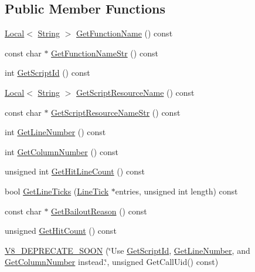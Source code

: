 \subsection*{Public Member Functions}
\begin{DoxyCompactItemize}
\item 
\mbox{\hyperlink{classv8_1_1Local}{Local}}$<$ \mbox{\hyperlink{classv8_1_1String}{String}} $>$ \mbox{\hyperlink{classv8_1_1CpuProfileNode_addacb8c9ca25fb14450f1bcf3c0ef4de}{Get\+Function\+Name}} () const
\item 
const char $\ast$ \mbox{\hyperlink{classv8_1_1CpuProfileNode_a8c6b47ccf397aed8f0454d9c6a4f05e2}{Get\+Function\+Name\+Str}} () const
\item 
int \mbox{\hyperlink{classv8_1_1CpuProfileNode_aef0b693911218f14745f2c51b4c9a860}{Get\+Script\+Id}} () const
\item 
\mbox{\hyperlink{classv8_1_1Local}{Local}}$<$ \mbox{\hyperlink{classv8_1_1String}{String}} $>$ \mbox{\hyperlink{classv8_1_1CpuProfileNode_aa827e7c9219cf49bdca2fcff33494ba0}{Get\+Script\+Resource\+Name}} () const
\item 
const char $\ast$ \mbox{\hyperlink{classv8_1_1CpuProfileNode_acae57cbfbc54cc9c030c31685571096a}{Get\+Script\+Resource\+Name\+Str}} () const
\item 
int \mbox{\hyperlink{classv8_1_1CpuProfileNode_a6616c8d1893da19183d57e6488eb2743}{Get\+Line\+Number}} () const
\item 
int \mbox{\hyperlink{classv8_1_1CpuProfileNode_a9df61090cf365f1f03d5bce44653f1f5}{Get\+Column\+Number}} () const
\item 
unsigned int \mbox{\hyperlink{classv8_1_1CpuProfileNode_a5b956d1b3aea5a9710632b28b1e85dfd}{Get\+Hit\+Line\+Count}} () const
\item 
bool \mbox{\hyperlink{classv8_1_1CpuProfileNode_a3a05d924e53c241225b9d3bf61af05db}{Get\+Line\+Ticks}} (\mbox{\hyperlink{structv8_1_1CpuProfileNode_1_1LineTick}{Line\+Tick}} $\ast$entries, unsigned int length) const
\item 
const char $\ast$ \mbox{\hyperlink{classv8_1_1CpuProfileNode_a4c811a611ba68f0484ad3eb560898889}{Get\+Bailout\+Reason}} () const
\item 
unsigned \mbox{\hyperlink{classv8_1_1CpuProfileNode_a56d1cece4ee808022b9eb7f3eb66b93a}{Get\+Hit\+Count}} () const
\item 
\mbox{\hyperlink{classv8_1_1CpuProfileNode_a5285f35c759e2b0afa74f4db0e0bc50c}{V8\+\_\+\+D\+E\+P\+R\+E\+C\+A\+T\+E\+\_\+\+S\+O\+ON}} (\char`\"{}Use \mbox{\hyperlink{classv8_1_1CpuProfileNode_aef0b693911218f14745f2c51b4c9a860}{Get\+Script\+Id}}, \mbox{\hyperlink{classv8_1_1CpuProfileNode_a6616c8d1893da19183d57e6488eb2743}{Get\+Line\+Number}}, and \mbox{\hyperlink{classv8_1_1CpuProfileNode_a9df61090cf365f1f03d5bce44653f1f5}{Get\+Column\+Number}} instead.\char`\"{}, unsigned Get\+Call\+Uid() const)

\end{DoxyCompactItemize}
